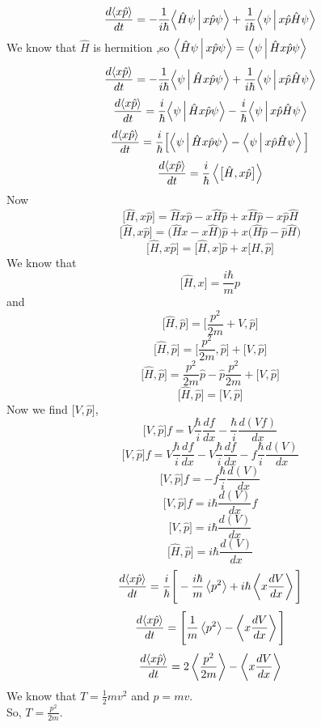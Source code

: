    $$\frac{d{\Braket{x\hat{p}}}}{dt}=-\frac{1}{i\hbar}{\Braket{\hat{H}{\psi}|x\hat{p}\psi}}+\frac{1}{i\hbar}{\Braket{\psi|{x\hat{p}}\hat{H}{\psi}}}$$
   We know that $\hat{H}$ is hermition ,so ${\Braket{\hat{H}{\psi}|x\hat{p}\psi}}={\Braket{{\psi}|\hat{H}x\hat{p}\psi}}$\\
   $$\frac{d{\Braket{x\hat{p}}}}{dt}=-\frac{1}{i\hbar}{\Braket{{\psi}|\hat{H}x\hat{p}\psi}}+\frac{1}{i\hbar}{\Braket{\psi|{x\hat{p}}\hat{H}{\psi}}}$$
   $$\frac{d{\Braket{x\hat{p}}}}{dt}=\frac{i}{\hbar}{\Braket{{\psi}|\hat{H}x\hat{p}\psi}}-\frac{i}{\hbar}{\Braket{\psi|{x\hat{p}}\hat{H}{\psi}}}$$
   $$\frac{d{\Braket{x\hat{p}}}}{dt}=\frac{i}{\hbar}\Big[{\Braket{{\psi}|\hat{H}x\hat{p}\psi}}-\Braket{\psi|{x\hat{p}}\hat{H}{\psi}}\Big]$$
    $$\frac{d{\Braket{x\hat{p}}}}{dt}=\frac{i}{\hbar}\Braket{\big[{\hat{H},x\hat{p}}\big]}$$
    Now$$\big[{\hat{H},x\hat{p}}\big]={\hat{H}x\hat{p}}-x\hat{H}\hat{p}+x\hat{H}\hat{p}-{x\hat{p}\hat{H}}$$
    $$\big[{\hat{H},x\hat{p}}\big]=\big({\hat{H}x}-x\hat{H}\big)\hat{p}+x\big(\hat{H}\hat{p}-{\hat{p}\hat{H}}\big)$$
    $$\big[{\hat{H},x\hat{p}}\big]=\big[{\hat{H}},x\big]\hat{p}+x\big[\hat{H},{\hat{p}}\big]$$
    We know that $$\big[{\hat{H}},x\big]=\frac{i\hbar}{m}{p}$$
    and
    $$\big[\hat{H},{\hat{p}}\big]=\Big[\frac{p^2}{2m}+V,{\hat{p}}\Big]$$
     $$\big[\hat{H},{\hat{p}}\big]=\Big[\frac{p^2}{2m},{\hat{p}}\Big]+\big[V,{\hat{p}}\big]$$
     $$\big[\hat{H},{\hat{p}}\big]=\frac{p^2}{2m}{\hat{p}}-{\hat{p}}\frac{p^2}{2m}+\big[V,{\hat{p}}\big]$$
       $$\big[\hat{H},{\hat{p}}\big]=\big[V,{\hat{p}}\big]$$
    Now we find $\big[V,{\hat{p}}\big]$,\\
    $$\big[V,{\hat{p}}\big]f=V\frac{\hbar}{i}\frac{df}{dx}-\frac{\hbar}{i}\frac{d(Vf)}{dx}$$
    $$\big[V,{\hat{p}}\big]f=V\frac{\hbar}{i}\frac{df}{dx}-V\frac{\hbar}{i}\frac{df}{dx}-{f}\frac{\hbar}{i}\frac{d(V)}{dx}$$
       $$\big[V,{\hat{p}}\big]f=-{f}\frac{\hbar}{i}\frac{d(V)}{dx}$$
       $$\big[V,{\hat{p}}\big]f={i}{\hbar}\frac{d(V)}{dx}{f}$$
        $$\big[V,{\hat{p}}\big]={i}{\hbar}\frac{d(V)}{dx}$$
       $$\big[\hat{H},{\hat{p}}\big]={i}{\hbar}\frac{d(V)}{dx}$$
       $$\frac{d{\Braket{x\hat{p}}}}{dt}=\frac{i}{\hbar}\Bigg[-\frac{i\hbar}{m}\Braket{p^2}+i{\hbar}\Braket{x\frac{dV}{dx}}\Bigg]$$
        $$\frac{d{\Braket{x\hat{p}}}}{dt}=\Bigg[\frac{1}{m}\Braket{p^2}-\Braket{x\frac{dV}{dx}}\Bigg]$$
       $$\frac{d{\Braket{x\hat{p}}}}{dt}=2\Braket{\frac{p^2}{2m}}-\Braket{x\frac{dV}{dx}}$$
       We know that $T=\frac{1}{2}m{v^2}$ and $p=mv$.\\ So, $T=\frac{p^2}{2m}.$\\
